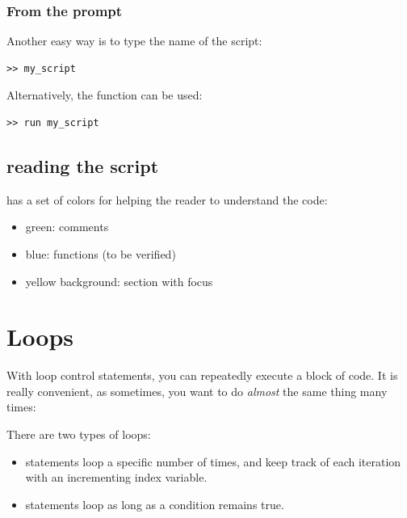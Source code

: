 			\subsubsection{From the prompt}
			Another easy way is to type the name of the script:
\begin{lstlisting}
>> my_script
\end{lstlisting}
			Alternatively, the function  can be used:
\begin{lstlisting}
>> run my_script
\end{lstlisting}

	\subsection{reading the script}
		\matlab has a set of colors for helping the reader to understand the code:
		\begin{itemize}
			\item green: comments
			\item blue: functions (to be verified)
			\item yellow background: section with focus
		\end{itemize}


\section{Loops}
	With loop control statements, you can repeatedly execute a block of code.
	It is really convenient, as sometimes, you want to do \emph{almost} the same thing many times:




	There are two types of loops:
	\begin{itemize}
		\item {} statements loop a specific number of times, and keep track of each iteration with an incrementing index variable.
		\item {} statements loop as long as a condition remains true.
	\end{itemize}
	
